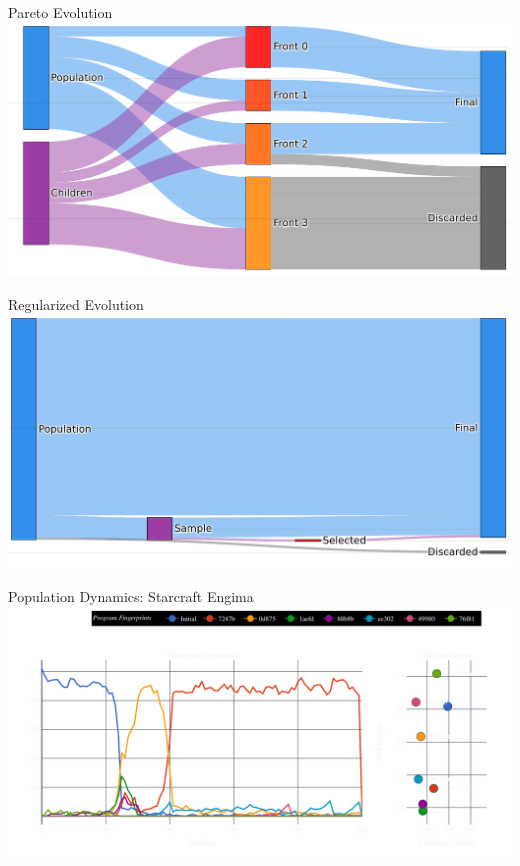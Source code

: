 \documentclass[aspectratio=169]{beamer}
\begin{document}
\begin{frame}{Pareto Evolution}
    \includegraphics[width=1.0\linewidth, keepaspectratio]{figures/paretoev.pdf}
\end{frame}

\begin{frame}{Regularized Evolution}
    \includegraphics[width=0.95\linewidth, keepaspectratio]{figures/regev.pdf}
\end{frame}

\begin{frame}{Population Dynamics: Starcraft Engima}
    \includegraphics[width=1.0\linewidth, keepaspectratio]{figures/early_pheno.pdf}
\end{frame}
\end{document}
